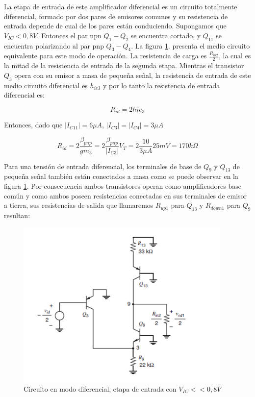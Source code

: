 \documentclass[12pt,a4paper,final,headinclude,footinclude,BCOR5mm]{scrartcl}
\begin{document}
La etapa de entrada de este amplificador diferencial es un circuito totalmente diferencial, formado por dos pares de emisores comunes y su resistencia de entrada depende de cual de los pares están conduciendo. Supongamos que $V_{IC} <  0,8 V$. Entonces el par npn $Q_{1}-Q_{2}$ se encuentra cortado, y $Q_{11}$ se encuentra polarizando al par pnp $Q_{3}-Q_{4}$. La figura \ref{644}. presenta el medio circuito equivalente para este modo de operación. La resistencia de carga es $\frac{R_{in2}}{2}$, la cual es la mitad de la resistencia de entrada de la segunda etapa. Mientras el transistor $Q_{3}$ opera con su emisor a masa de pequeña señal, la resistencia de entrada de este medio circuito diferencial es $h_{ie3}$ y por lo tanto la resistencia de entrada diferencial es:

$$R_{id} = 2 hie_{3}$$

Entonces, dado que $|I_{C11}| = 6 \mu A$, $|I_{C3}| = |I_{C4}| = 3 \mu A$

$$R_{id} = 2 \frac{\beta_{pnp}}{gm_{3}} = 2 \frac{\beta_{pnp}}{|I_{C3}|}V_{T} = 2 \frac{10}{3 \mu A}25 mV = 170 k\Omega$$
	
Para una tensión de entrada diferencial, los terminales de base de $Q_{9}$ y $Q_{13}$ de pequeña señal también están conectados a masa como se puede observar en la figura \ref{644}. Por consecuencia ambos transistores operan como amplificadores base común y como ambos poseen resistencias conectadas en sus terminales de emisor a tierra, sus resistencias de salida que llamaremos $R_{up1}$ para $Q_{13}$ y $R_{down1}$ para $Q_{9}$ resultan:	
	
\begin{figure}[!h]
\begin{center}
\includegraphics[width=300pt]{./imagenes/diffmode.png}
\end{center}
\caption{Circuito en modo diferencial, etapa de entrada con $V_{IC} << 0,8 V$}
\label{644}
\end{figure}
	
\end{document}
